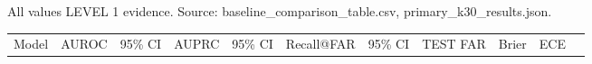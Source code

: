 \documentclass[
]{article}
\newcounter{none} %
\begin{document}
All values LEVEL 1 evidence. Source: baseline\_comparison\_table.csv,
primary\_k30\_results.json.

{\def\LTcaptype{none} %
\begin{longtable}[]{@{}
  >{\raggedright\arraybackslash}p{}
  >{\raggedright\arraybackslash}p{}
  >{\raggedright\arraybackslash}p{}
  >{\raggedright\arraybackslash}p{}
  >{\raggedright\arraybackslash}p{}
  >{\raggedright\arraybackslash}p{}
  >{\raggedright\arraybackslash}p{}
  >{\raggedright\arraybackslash}p{}
  >{\raggedright\arraybackslash}p{}
  >{\raggedright\arraybackslash}p{}
  >{\raggedright\arraybackslash}p{}@{}}
\toprule\noalign{}
\begin{minipage}[b]{\linewidth}\raggedright
Model
\end{minipage} & \begin{minipage}[b]{\linewidth}\raggedright
AUROC
\end{minipage} & \begin{minipage}[b]{\linewidth}\raggedright
95\% CI
\end{minipage} & \begin{minipage}[b]{\linewidth}\raggedright
AUPRC
\end{minipage} & \begin{minipage}[b]{\linewidth}\raggedright
95\% CI
\end{minipage} & \begin{minipage}[b]{\linewidth}\raggedright
Recall@FAR
\end{minipage} & \begin{minipage}[b]{\linewidth}\raggedright
95\% CI
\end{minipage} & \begin{minipage}[b]{\linewidth}\raggedright
TEST FAR
\end{minipage} & \begin{minipage}[b]{\linewidth}\raggedright
Brier
\end{minipage} & \begin{minipage}[b]{\linewidth}\raggedright
ECE
\end{minipage} & \begin{minipage}[b]{\linewidth}\raggedright

\end{minipage}
\end{longtable}}
\end{document}
